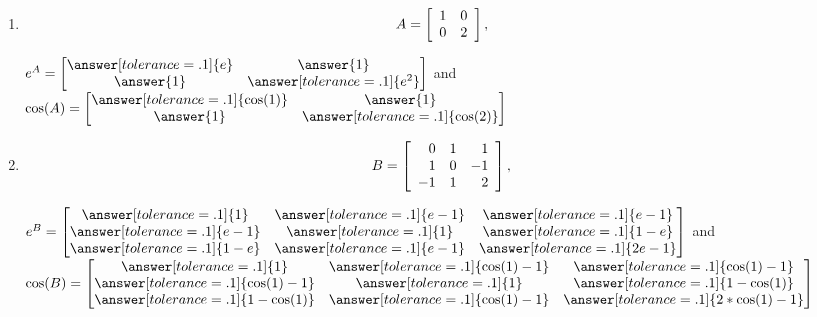\documentclass{ximera}
\begin{document}
\begin{problem}
  
  \begin{enumerate}
    \item $$A = \startmat{rr}
      1 & 0 \\
      0 & 2 \\
    \stopmat,$$
    
    $e^A=\begin{bmatrix}
      \answer[tolerance=.1]{e} & \answer{1}\\
      \answer{1} & \answer[tolerance=.1]{e^2}
    \end{bmatrix}$ and $\cos(A)=\begin{bmatrix}
      \answer[tolerance=.1]{\cos(1)} & \answer{1}\\
      \answer{1} & \answer[tolerance=.1]{\cos(2)}
    \end{bmatrix}$


    \item $$B = \startmat{rrr}
      0 & 1 & 1 \\
      1 & 0 & -1 \\
      -1 & 1 & 2 \\
    \stopmat,$$

    $e^B=\begin{bmatrix}
      \answer[tolerance=.1]{1}&\answer[tolerance=.1]{e-1}&\answer[tolerance=.1]{e-1}\\
      \answer[tolerance=.1]{e-1}& \answer[tolerance=.1]{1} & \answer[tolerance=.1]{1-e}\\
      \answer[tolerance=.1]{1-e}& \answer[tolerance=.1]{e-1} & \answer[tolerance=.1]{2e-1}
    \end{bmatrix}$ and $\cos(B)=\begin{bmatrix}
      \answer[tolerance=.1]{1}&\answer[tolerance=.1]{\cos(1)-1}&\answer[tolerance=.1]{\cos(1)-1}\\
      \answer[tolerance=.1]{\cos(1)-1}& \answer[tolerance=.1]{1} & \answer[tolerance=.1]{1-\cos(1)}\\
      \answer[tolerance=.1]{1-\cos(1)}& \answer[tolerance=.1]{\cos(1)-1} & \answer[tolerance=.1]{2*\cos(1)-1}
    \end{bmatrix}$


  \end{enumerate}

  
\end{problem}
\end{document}
